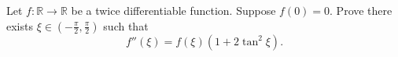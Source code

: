 Let \(f\colon \mathbb{R} \to \mathbb{R}\) be a twice differentiable function.
Suppose \(f(0) = 0\).
Prove there exists
\(\xi \in (-\frac{\pi}{2},\frac{\pi}{2})\)
such that
\[f''(\xi) = f(\xi) (1 + 2{{\tan}^2} \xi).\]
